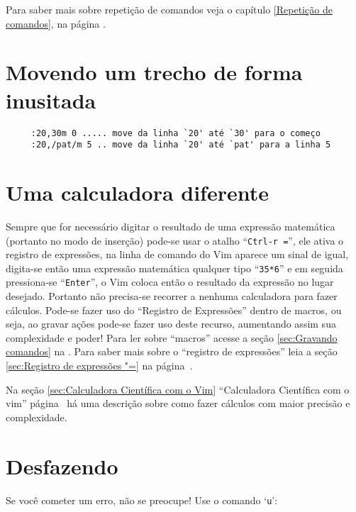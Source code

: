 {\Large {}} Para saber mais sobre repetição de comandos veja o capítulo
\ref{Repetição de comandos}, na página \pageref{Repetição de comandos}.

\section{Movendo um trecho de forma inusitada}
\label{Movendo um trecho de forma inusitada}

\begin{verbatim}
     :20,30m 0 ..... move da linha `20' até `30' para o começo
     :20,/pat/m 5 .. move da linha `20' até `pat' para a linha 5
\end{verbatim}


\section{Uma calculadora diferente}
\label{Uma calculadora diferente}

Sempre que for necessário digitar  o resultado de uma expressão matemática
(portanto no modo de inserção) pode-se usar o atalho ``{\tt Ctrl-r =}'', ele
ativa o registro de expressões, na linha de comando do Vim aparece um sinal de
igual, digita-se então uma expressão matemática qualquer tipo ``{\tt 35*6}'' e
em seguida pressiona-se ``{\tt Enter}'', o Vim coloca então o resultado da
expressão no lugar desejado.  Portanto não precisa-se recorrer a nenhuma
calculadora para fazer cálculos.  Pode-se fazer uso do ``Registro de
Expressões'' dentro de macros, ou seja, ao gravar ações pode-se fazer uso deste
recurso, aumentando assim sua complexidade e poder! Para ler sobre ``macros''
acesse a seção \ref{sec:Gravando comandos} na \pageref{sec:Gravando comandos}.
Para saber mais sobre o ``registro de expressões'' leia a seção
\ref{sec:Registro de expressões "=} na página~\pageref{sec:Registro de expressões "=}.

{\Large {}} Na seção \ref{sec:Calculadora Científica com o Vim}
``Calculadora Científica com o vim'' página~\pageref{sec:Calculadora Científica com
o Vim} há uma descrição sobre como fazer cálculos com maior precisão e
complexidade.

\section{Desfazendo}
\label{Desfazendo}

Se você cometer um erro, não se preocupe! Use o comando `{\tt u}':

